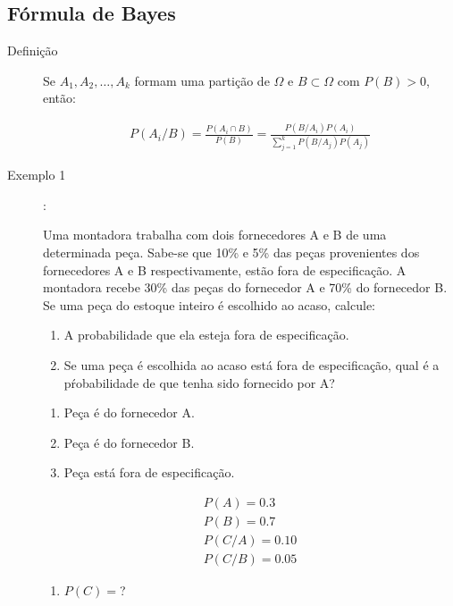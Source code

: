    \subsection{Fórmula de Bayes}
   \begin{description}
     \item [Definição] Se $A_1,A_2,\ldots, A_k$ formam uma partição de $\Omega$ e 
       $B \subset \Omega$ com $P(B)>0$, então:

       \begin{align}
         P(A_i/ B)= \frac{P(A_i \cap B)}{P(B)}         =\frac{P(B/A_i)P(A_i)}{\displaystyle{\sum \limits_{j=1}^k P(B/A_j)P(A_j)}}
       \end{align}

     \item [Exemplo 1]: 

       Uma montadora trabalha com dois fornecedores A e B de uma determinada peça.
       Sabe-se que 10\% e 5\% das peças provenientes dos fornecedores A e B respectivamente,
       estão fora de especificação. A montadora recebe 30\% das peças do fornecedor A e 70\%
       do fornecedor B. Se uma peça do estoque inteiro é escolhido ao acaso, calcule:

       \begin{enumerate}[label=(\alph*)]
         \item A probabilidade que ela esteja fora de especificação.
         \item Se uma peça é escolhida ao acaso está fora de especificação, qual é a 
           pŕobabilidade de que tenha sido fornecido por A?
       \end{enumerate}
       \begin{enumerate}[label=\Alph*:]
         \item  Peça é do fornecedor A.
         \item  Peça é do fornecedor B.
         \item  Peça está fora de especificação.
       \end{enumerate}
       \begin{align*}
         P(A)= 0.3\\
         P(B)=0.7\\
         P(C/A)= 0.10\\
         P(C/B)= 0.05
       \end{align*}
       \begin{enumerate}[label=(\alph*)]
         \item $P(C)=$?


\end{enumerate}
\end{description}
